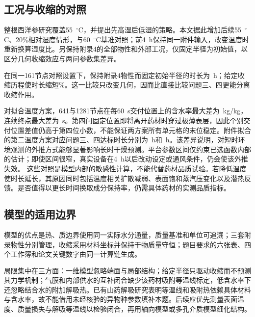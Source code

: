 \subsection{工况与收缩的对照}

整根西洋参研究覆盖55~$^\circ$C，并提出先高湿后低湿的策略\cite{ju2020}。本文据此增加后续55~$^\circ$C、20\%相对湿度情形，与60~$^\circ$C基准对照；前4~h保持同一附件输入，改变温度时重新换算湿度比。另保持附录4的全部物性和外部工况，仅固定半径为初始值，以区分几何收缩效应与两问参数集差异。

在同一161节点对照设置下，保持附录4物性而固定初始半径的时长为\QFourFixedEndH{}~h；给定收缩历程使时长缩短\QFourShrinkReductionPercent{}\%。这一比较只改变几何，因而比直接比较问题三、四更能分离收缩作用。

对拟合温度方案，641与1281节点在每60~s交付位置上的含水率最大差为\texttt{\FitOutputGridCError}~kg/kg，连续终点最大差为\FitGridEndErrorS{}~s。第四问固定位置即将离开药材时穿过极薄表层，因此个别交付位置差值仍高于第四位小数，不能保证两方案所有单元格的末位稳定。附件拟合的第二温度方案对应问题三、四达标时长分别为\FitQThreeEndH{}~h和\FitQFourEndH{}~h。该差异说明，对短时环境观测的外推方式能够显著影响长时干燥预测。平台参数区间仅约束已选函数内部的估计；即使区间很窄，真实设备在4~h以后改动设定或通风条件，仍会使该外推失效。
这些对照是模型内部的敏感性计算，不能代替药材品质试验。若降低温度使时长延长，其原因同时包括温度相关扩散减弱、表面饱和蒸汽压变化以及潜热反馈。是否值得以更长时间换取成分保持率，仍需具体药材的实测品质指标。

\subsection{模型的适用边界}
模型的优点是热、质边界使用同一实际水分通量，质量基准和单位可追溯；三套附录物性分别管理，收缩采用材料坐标并保持干物质量守恒；题目要求的六张表、四个工作簿和论文关键数字由同一计算链生成。

局限集中在三方面：一维模型忽略端面与局部结构；给定半径只驱动收缩而不预测其力学机制；气膜和内部供水的互补闭合缺少该药材吸附等温线标定，低含水率下还忽略结合水的附加解吸热。已有山药解吸研究表明等温线和吸附热依赖具体材料与含水率\cite{njie1999}，故不能借用未经核验的异物种参数填补本题。后续应优先测量表面温度、质量损失与解吸等温线以检验闭合，再用轴向模型或多孔介质模型细化结构。
